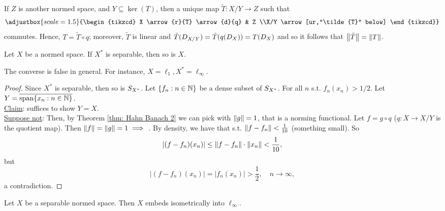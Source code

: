 \documentclass{article}
\begin{document}
If $Z$ is another normed space,  and $Y\subseteq \ker(T)$, then \isthere a unique map $\tilde{T}:X/Y\to Z$ such that
$$ \adjustbox{scale = 1.5}{\begin{tikzcd}
X \arrow{r}{T} \arrow{d}{q} & Z \\%
X/Y \arrow[ur,"\tilde{T}" below]
\end{tikzcd}}
$$   
commutes. Hence, $T = \tilde{T}\circ q$; moreover, $\tilde{T}$ is linear and $\tilde{T}(D_{X/Y})=\tilde{T}(q(D_{X}))=T(D_{X})$ and so it follows that $\left\lVert\tilde{T}\right\rVert=\left\lVert T\right\rVert$.

\newpage

\begin{theorem}\label{thm: separable dual}
    Let $X$ be a normed space. If $X^*$ is separable, then so is $X$.
\end{theorem}

\begin{remark}
    The converse is false in general. For instance, $X=\ell_1, X^*=\ell_\infty$.
\end{remark}

\begin{proof}
    Since $X^*$ is separable, then so is $S_{X^*}$. Let $\{f_n:n\in\mathbb{N}\}$ be a dense subset of $S_{X^*}$. For all $n $ \isthere {} s.t. $f_n(x_n)>1/2$. Let $Y=\overline{\operatorname{span}\{x_n:n\in\mathbb{N}\}}$.\\
    
    \noindent\underline{Claim}: suffices to show $Y=X$.\\

    \noindent\underline{Suppose not}: Then, by Theorem \ref{thm: Hahn Banach 2} we can pick  with $\left\lVert g\right\rVert=1$, that is a norming functional. Let $f = g\circ q$ ($q:X\to X/Y$ is the quotient map). Then $\left\lVert f\right\rVert=\left\lVert g\right\rVert=1\implies$ . By density, we have that \isthere {} s.t. $\left\lVert f-f_n\right\rVert<\frac{1}{10}$ (something small). So\\
    $$|(f-f_n)(x_n)|\leq \left\lVert f-f_n\right\rVert\cdot\left\lVert x_n\right\rVert<\frac{1}{10},$$ but\\
    $$|(f-f_n)(x_n)|=|f_n(x_n)|>\frac{1}{2}, \quad n\to\infty, 
    $$
    a contradiction.
\end{proof}

\begin{theorem}
    Let $X$ be a separable normed space. Then $X$ embeds isometrically into $\ell_\infty$.
\end{theorem}
\end{document}
